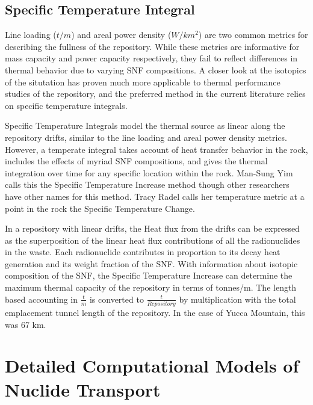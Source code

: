 \subsection{Specific Temperature Integral}

Line loading ($t/m$) and areal power density ($W/km^2$) are two common 
metrics for describing the fullness of the repository. While these 
metrics are informative for mass capacity and power capacity 
respectively, they fail to reflect differences in thermal behavior due 
to varying SNF compositions.  A closer look at the isotopics of the 
situtation has proven much more applicable to thermal performance 
studies of the repository, and the preferred method in the current 
literature relies on specific temperature integrals.


Specific Temperature Integrals model the thermal source as linear 
along the repository drifts, similar to the line loading and areal 
power density metrics. However, a temperate integral takes account of 
heat transfer behavior in the rock, includes the effects of myriad SNF 
compositions, and gives the thermal integration over time for any 
specific location within the rock.  Man-Sung Yim calls this the 
Specific Temperature Increase method\cite{li_specific_2008} though other 
researchers have other names for this method. Tracy Radel calls her 
temperature metric at a point in the rock the Specific Temperature 
Change.\cite{radel_repository_2007}

In a repository with linear drifts, the Heat flux from the drifts can 
be expressed as the superposition of the linear heat flux 
contributions of all the radionuclides in the waste. Each radionuclide 
contributes in proportion to its decay heat generation and its weight 
fraction of the SNF. With information about isotopic composition of 
the SNF, the Specific Temperature Increase can determine the maximum 
thermal capacity of the repository in terms of tonnes/m. The length 
based accounting in $\frac{t}{m}$ is converted to 
$\frac{t}{Repository}$ by multiplication with the total emplacement 
tunnel length of the repository.  In the case of Yucca Mountain, this 
was 67 km.


\section{Detailed Computational Models of Nuclide Transport}
\label{sec:detailed_nuclide}



